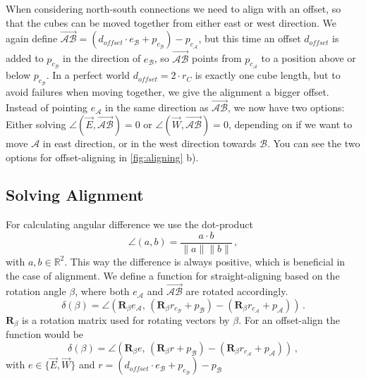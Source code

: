 When considering north-south connections we need to align with an offset, so that the cubes can be moved together from either east or west direction.
We again define $\overrightarrow{\mathcal{A}\mathcal{B}} = \left( d_\textit{offset} \cdot e_\mathcal{B} + p_{c_\mathcal{B}} \right) - p_{c_\mathcal{A}}$, but this time an offset $d_\textit{offset}$ is added to $p_{c_\mathcal{B}}$ in the direction of $e_\mathcal{B}$, so $\overrightarrow{\mathcal{A}\mathcal{B}}$ points from $p_{c_\mathcal{A}}$ to a position above or below $p_{c_\mathcal{B}}$.
In a perfect world $d_\textit{offset} = 2 \cdot r_C$ is exactly one cube length, but to avoid failures when moving together, we give the alignment a bigger offset.
Instead of pointing $e_\mathcal{A}$ in the same direction as $\overrightarrow{\mathcal{A}\mathcal{B}}$, we now have two options:
Either solving $\angle \left( \vec{E}, \overrightarrow{\mathcal{A}\mathcal{B}} \right) = 0$ or $\angle \left( \vec{W}, \overrightarrow{\mathcal{A}\mathcal{B}} \right) = 0$, depending on if we want to move $\mathcal{A}$ in east direction, or in the west direction towards $\mathcal{B}$.
You can see the two options for offset-aligning in \autoref{fig:aligning} b).

\subsection{Solving Alignment}

For calculating angular difference we use the dot-product
\begin{equation*}
\angle (a,b) = \frac{a \cdot b}{\lVert a \rVert \lVert b \rVert} \,,
\end{equation*}
with $a,b \in \mathbb{R}^2$. This way the difference is always positive, which is beneficial in the case of alignment.
We define a function for straight-aligning based on the rotation angle $\beta$, where both $e_\mathcal{A}$ and $\overrightarrow{\mathcal{A}\mathcal{B}}$ are rotated accordingly.
\begin{equation}
\delta(\beta) = \angle \left( \mathbf{R}_\beta e_\mathcal{A}, \, \left( \mathbf{R}_\beta r_{c_\mathcal{B}} + p_\mathcal{B} \right) - \left( \mathbf{R}_\beta r_{c_\mathcal{A}} + p_\mathcal{A} \right)\right) \,.
\end{equation}
$\mathbf{R}_\beta$ is a rotation matrix used for rotating vectors by $\beta$.
For an offset-align the function would be
\begin{equation}
\delta(\beta) = \angle \left( \mathbf{R}_\beta e, \, \left( \mathbf{R}_\beta r + p_\mathcal{B} \right) - \left( \mathbf{R}_\beta r_{c_\mathcal{A}} + p_\mathcal{A} \right)\right) \,,
\end{equation}
with $e \in \{ \vec{E}, \vec{W}\}$ and $r = \left( d_\textit{offset} \cdot e_\mathcal{B} + p_{c_\mathcal{B}} \right) - p_\mathcal{B}$

